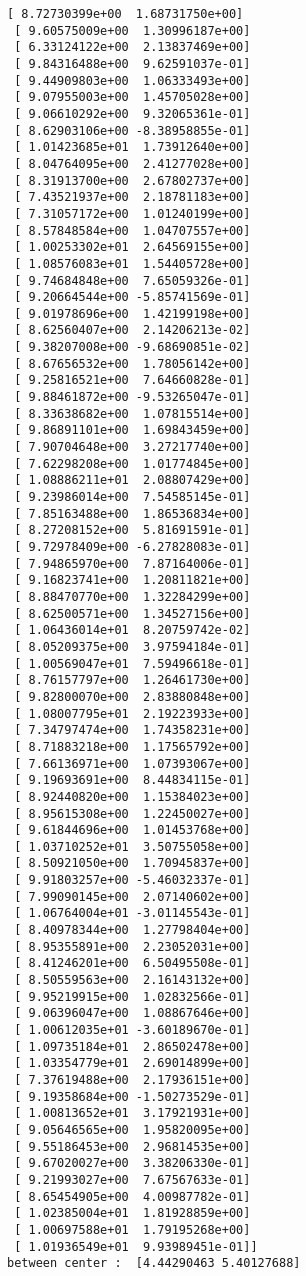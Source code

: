 \documentclass[11pt]{article}
\begin{document}
\begin{Verbatim}[commandchars=\\\{\}]
 [ 8.72730399e+00  1.68731750e+00]
 [ 9.60575009e+00  1.30996187e+00]
 [ 6.33124122e+00  2.13837469e+00]
 [ 9.84316488e+00  9.62591037e-01]
 [ 9.44909803e+00  1.06333493e+00]
 [ 9.07955003e+00  1.45705028e+00]
 [ 9.06610292e+00  9.32065361e-01]
 [ 8.62903106e+00 -8.38958855e-01]
 [ 1.01423685e+01  1.73912640e+00]
 [ 8.04764095e+00  2.41277028e+00]
 [ 8.31913700e+00  2.67802737e+00]
 [ 7.43521937e+00  2.18781183e+00]
 [ 7.31057172e+00  1.01240199e+00]
 [ 8.57848584e+00  1.04707557e+00]
 [ 1.00253302e+01  2.64569155e+00]
 [ 1.08576083e+01  1.54405728e+00]
 [ 9.74684848e+00  7.65059326e-01]
 [ 9.20664544e+00 -5.85741569e-01]
 [ 9.01978696e+00  1.42199198e+00]
 [ 8.62560407e+00  2.14206213e-02]
 [ 9.38207008e+00 -9.68690851e-02]
 [ 8.67656532e+00  1.78056142e+00]
 [ 9.25816521e+00  7.64660828e-01]
 [ 9.88461872e+00 -9.53265047e-01]
 [ 8.33638682e+00  1.07815514e+00]
 [ 9.86891101e+00  1.69843459e+00]
 [ 7.90704648e+00  3.27217740e+00]
 [ 7.62298208e+00  1.01774845e+00]
 [ 1.08886211e+01  2.08807429e+00]
 [ 9.23986014e+00  7.54585145e-01]
 [ 7.85163488e+00  1.86536834e+00]
 [ 8.27208152e+00  5.81691591e-01]
 [ 9.72978409e+00 -6.27828083e-01]
 [ 7.94865970e+00  7.87164006e-01]
 [ 9.16823741e+00  1.20811821e+00]
 [ 8.88470770e+00  1.32284299e+00]
 [ 8.62500571e+00  1.34527156e+00]
 [ 1.06436014e+01  8.20759742e-02]
 [ 8.05209375e+00  3.97594184e-01]
 [ 1.00569047e+01  7.59496618e-01]
 [ 8.76157797e+00  1.26461730e+00]
 [ 9.82800070e+00  2.83880848e+00]
 [ 1.08007795e+01  2.19223933e+00]
 [ 7.34797474e+00  1.74358231e+00]
 [ 8.71883218e+00  1.17565792e+00]
 [ 7.66136971e+00  1.07393067e+00]
 [ 9.19693691e+00  8.44834115e-01]
 [ 8.92440820e+00  1.15384023e+00]
 [ 8.95615308e+00  1.22450027e+00]
 [ 9.61844696e+00  1.01453768e+00]
 [ 1.03710252e+01  3.50755058e+00]
 [ 8.50921050e+00  1.70945837e+00]
 [ 9.91803257e+00 -5.46032337e-01]
 [ 7.99090145e+00  2.07140602e+00]
 [ 1.06764004e+01 -3.01145543e-01]
 [ 8.40978344e+00  1.27798404e+00]
 [ 8.95355891e+00  2.23052031e+00]
 [ 8.41246201e+00  6.50495508e-01]
 [ 8.50559563e+00  2.16143132e+00]
 [ 9.95219915e+00  1.02832566e-01]
 [ 9.06396047e+00  1.08867646e+00]
 [ 1.00612035e+01 -3.60189670e-01]
 [ 1.09735184e+01  2.86502478e+00]
 [ 1.03354779e+01  2.69014899e+00]
 [ 7.37619488e+00  2.17936151e+00]
 [ 9.19358684e+00 -1.50273529e-01]
 [ 1.00813652e+01  3.17921931e+00]
 [ 9.05646565e+00  1.95820095e+00]
 [ 9.55186453e+00  2.96814535e+00]
 [ 9.67020027e+00  3.38206330e-01]
 [ 9.21993027e+00  7.67567633e-01]
 [ 8.65454905e+00  4.00987782e-01]
 [ 1.02385004e+01  1.81928859e+00]
 [ 1.00697588e+01  1.79195268e+00]
 [ 1.01936549e+01  9.93989451e-01]] 
between center :  [4.44290463 5.40127688] 


    \end{Verbatim}
\end{document}
